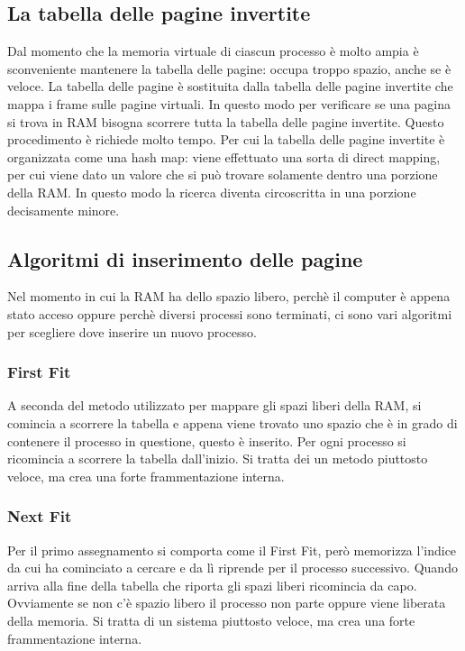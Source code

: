 \documentclass{article}
\begin{document}
\subsection{La tabella delle pagine invertite}
Dal momento che la memoria virtuale di ciascun processo è molto ampia è sconveniente mantenere la tabella delle pagine: occupa troppo spazio, anche se è veloce. La tabella delle pagine è sostituita dalla tabella delle pagine invertite che mappa i frame sulle pagine virtuali. In questo modo per verificare se una pagina si trova in RAM bisogna scorrere tutta la tabella delle pagine invertite. Questo procedimento è richiede molto tempo. Per cui la tabella delle pagine invertite è organizzata come una hash map: viene effettuato una sorta di direct mapping, per cui viene dato un valore che si può trovare solamente dentro una porzione della RAM. In questo modo la ricerca diventa circoscritta in una porzione decisamente minore.

\subsection{Algoritmi di inserimento delle pagine}
Nel momento in cui la RAM ha dello spazio libero, perchè il computer è appena stato acceso oppure perchè diversi processi sono terminati, ci sono vari algoritmi per scegliere dove inserire un nuovo processo.

\subsubsection{First Fit} 
A seconda del metodo utilizzato per mappare gli spazi liberi della RAM, si comincia a scorrere la tabella e appena viene trovato uno spazio che è in grado di contenere il processo in questione, questo è inserito. Per ogni processo si ricomincia a scorrere la tabella dall'inizio. Si tratta dei un metodo piuttosto veloce, ma crea una forte frammentazione interna.

\subsubsection{Next Fit} 
Per il primo assegnamento si comporta come il First Fit, però memorizza l'indice da cui ha cominciato a cercare e da lì riprende per il processo successivo. Quando arriva alla fine della tabella che riporta gli spazi liberi ricomincia da capo. Ovviamente se non c'è spazio libero il processo non parte oppure viene liberata della memoria. Si tratta di un sistema piuttosto veloce, ma crea una forte frammentazione interna.
\end{document}
